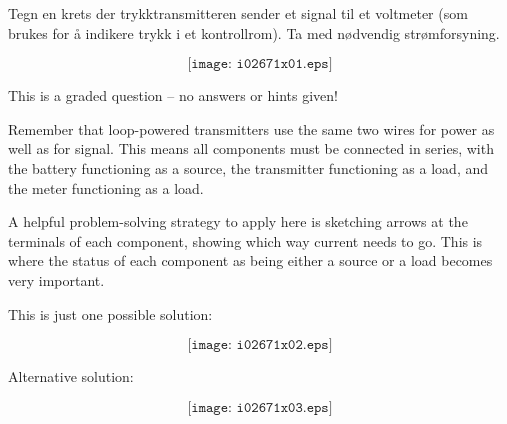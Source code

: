 

Tegn en krets der trykktransmitteren sender et signal til et voltmeter (som brukes for å indikere trykk i et kontrollrom). Ta med nødvendig strømforsyning.


\vskip 50pt

$$\texttt{[image: i02671x01.eps]}$$

\vfil 

\eject






This is a graded question -- no answers or hints given!







Remember that loop-powered transmitters use the same two wires for power as well as for signal.  This means all components must be connected in series, with the battery functioning as a source, the transmitter functioning as a load, and the meter functioning as a load.

\vskip 10pt

A helpful problem-solving strategy to apply here is sketching arrows at the terminals of each component, showing which way current needs to go.  This is where the status of each component as being either a source or a load becomes very important.

\vskip 10pt

This is just one possible solution:

$$\texttt{[image: i02671x02.eps]}$$

\vskip 10pt

Alternative solution:

$$\texttt{[image: i02671x03.eps]}$$




